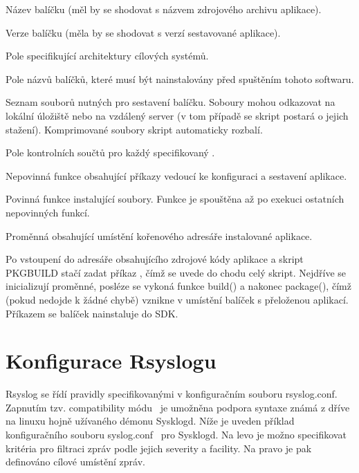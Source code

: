 \documentclass[thesis=B,czech]{FITthesis}[2012/06/26]
\begin{document}
\begin{description}
  \setlength\itemsep{-1ex}
  \item [pkgname:] Název balíčku (měl by se shodovat s názvem zdrojového archivu aplikace).
  \item [pkgver:] Verze balíčku (měla by se shodovat s verzí sestavované aplikace).
  \item [arch:] Pole specifikující architektury cílových systémů.
  \item [depends:] Pole názvů balíčků, které musí být nainstalovány před spuštěním tohoto softwaru.
  \item [source:] Seznam souborů nutných pro sestavení balíčku. Soboury mohou odkazovat na lokální úložiště nebo na vzdálený server (v tom případě se skript postará o jejich stažení). Komprimované soubory skript automaticky rozbalí.
  \item [md5sum:] Pole kontrolních součtů pro každý specifikovaný .
  \item [build():] Nepovinná funkce obsahující příkazy vedoucí ke konfiguraci a sestavení aplikace.
  \item [package():] Povinná funkce instalující soubory. Funkce je spouštěna až po exekuci ostatních nepovinných funkcí.
  \item [pkgdir:] Proměnná obsahující umístění kořenového adresáře instalované aplikace.
\end{description}

Po vstoupení do adresáře obsahujícího zdrojové kódy aplikace a skript PKGBUILD stačí zadat příkaz , čímž se uvede do chodu celý skript. Nejdříve se inicializují proměnné, posléze se vykoná funkce build() a nakonec package(), čímž (pokud nedojde k žádné chybě) vznikne v umístění  balíček s přeloženou aplikací.
Příkazem  se balíček nainstaluje do SDK.

\section{Konfigurace Rsyslogu}
Rsyslog se řídí pravidly specifikovanými v konfiguračním souboru rsyslog.conf. Zapnutím tzv. compatibility módu~\cite{Rsyslog-comp-mode} je umožněna podpora syntaxe známá z dříve na linuxu hojně užívaného démonu Sysklogd. Níže je uveden příklad konfiguračního souboru syslog.conf~\cite{Syslog-conf} pro Sysklogd. Na levo je možno specifikovat kritéria pro filtraci zpráv podle jejich severity a facility. Na pravo je pak definováno cílové umístění zpráv.
\end{document}
